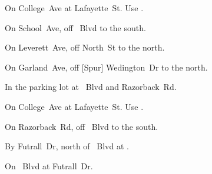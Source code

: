 
\begin{LocationList}

On College~Ave at  Lafayette~St.
Use  .

On School~Ave, off  \MLKing~Blvd to the south.

\Location{\GarageHQ \Garage}
On Leverett~Ave, off North~St to the north.

On  Garland~Ave, off [Spur] Wedington~Dr to the north.

In the parking lot at  \MLKing~Blvd and Razorback~Rd.

On College~Ave at  Lafayette~St.
Use  .

On Razorback~Rd, off  \MLKing~Blvd to the south.

\Location{\TruckService \Service}
By Futrall~Dr, north of  \MLKing~Blvd at .

On  \MLKing~Blvd at Futrall~Dr.

\end{LocationList}

